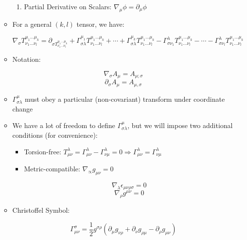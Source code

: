 \begin{itemize}
\begin{itemize}
\begin{enumerate}
          \item Partial Derivative on Scalars: $\nabla_{\mu}\phi=\partial_{\mu}\phi$

        \end{enumerate}

      \item For a general $(k,l)$ tensor, we have:

        $$\nabla_{\sigma}T^{\mu_1\ldots\mu_k}_{\nu_1\ldots\nu_l}=\partial_{\sigma T^{\mu_1\ldots\mu_k}_{\nu_1\ldots\nu_l}}+\Gamma^{\mu_1}_{\sigma\lambda}T^{\mu_1\ldots\mu_k}_{\nu_1\ldots\nu_l}+\cdots+\Gamma^{\mu_k}_{\sigma \lambda}T^{\mu_1\ldots\mu_k}_{\nu_1\ldots\nu_l}-\Gamma^{\lambda}_{\sigma\nu_1}T^{\mu_1\ldots\mu_k}_{\nu_1\ldots\nu_l}-\cdots-\Gamma^{\lambda}_{\sigma \nu_l}T^{\mu_1\ldots\mu_k}_{\nu_1\ldots\nu_l}$$

      \item Notation:

        $$\nabla_{\sigma}A_{\mu}=A_{\mu;\sigma}$$
        $$\partial_{\sigma}A_{\mu}=A_{\mu,\sigma}$$

      \item $\Gamma^{\mu}_{\sigma\lambda}$ must obey a particular (non-covariant) transform under coordinate change

      \item We have a lot of freedom to define $\Gamma^{\mu}_{\sigma\lambda}$, but we will impose two additional conditions (for convenience):

        \begin{itemize}

          \item Torsion-free: $T^{\lambda}_{\mu\nu}=\Gamma^{\lambda}_{\mu\nu}-\Gamma^{\lambda}_{\nu\mu}=0\Rightarrow \Gamma^{\lambda}_{\mu\nu}=\Gamma^{\lambda}_{\nu\mu}$

          \item Metric-compatible: $\nabla_{\propto}g_{\mu\nu}=0$

            $$\nabla_{\lambda}\epsilon_{\mu\nu\rho\sigma}=0$$
            $$\nabla_{\rho}g^{\mu\nu}=0$$

        \end{itemize}

      \item Christoffel Symbol:

        $$\Gamma_{\mu\nu}^{\sigma}=\frac{1}{2}g^{\sigma\rho}\left( \partial_{\mu}g_{\nu\rho}+\partial_{\nu}g_{\rho\mu}-\partial_{\rho}g_{\mu\nu} \right)$$

    \end{itemize}


\end{itemize}
